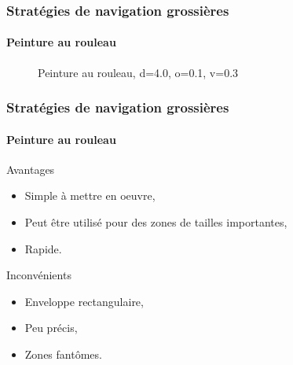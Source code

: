 \documentclass{beamer}
\begin{document}
				\begin{frame}
					\frametitle{Stratégies de navigation grossières}
					\framesubtitle{Peinture au rouleau}
					\begin{figure}[H]
						\centering
						\caption{Peinture au rouleau, d=4.0, o=0.1, v=0.3}
					\end{figure}
				\end{frame}
				\begin{frame}
					\frametitle{Stratégies de navigation grossières}
					\framesubtitle{Peinture au rouleau}
					\begin{exampleblock}{Avantages}
						\begin{itemize}
							\item Simple à mettre en oeuvre,
							\item Peut être utilisé pour des zones de tailles importantes,
							\item Rapide.
						\end{itemize}
					\end{exampleblock}
					\begin{alertblock}{Inconvénients}
						\begin{itemize}
							\item Enveloppe rectangulaire,
							\item Peu précis,
							\item Zones fantômes.
						\end{itemize}
					\end{alertblock}
				\end{frame}
\end{document}
